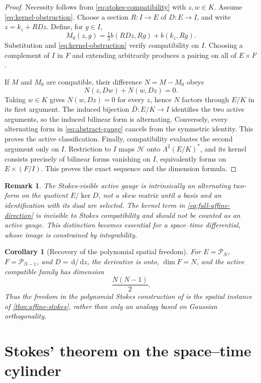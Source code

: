 \documentclass[11pt,a4paper]{article}
\newtheorem{corollary}[theorem]{Corollary}
\newtheorem{remark}[theorem]{Remark}
\newcommand{\cP}{\mathcal P}
\newcommand{\dd}{\,\mathrm d}
\begin{document}
\begin{proof}
Necessity follows from \cref{eq:stokes-compatibility} with \(z,w\in K\).
Assume \cref{eq:kernel-obstruction}. Choose a section
\(R:I\to E\) of \(D:E\to I\), and write \(z=k_z+RDz\). Define, for
\(g\in I\),
\[
 M_0(z,g)=\tfrac12 b(RDz,Rg)+b(k_z,Rg).
\]
Substitution and \cref{eq:kernel-obstruction} verify compatibility on
\(I\).  Choosing a complement of \(I\) in \(F\) and extending arbitrarily
produces a pairing on all of \(E\times F\).

If \(M\) and \(M_0\) are compatible, their difference \(N=M-M_0\) obeys
\[
 N(z,Dw)+N(w,Dz)=0.
\]
Taking \(w\in K\) gives \(N(w,Dz)=0\) for every \(z\), hence \(N\) factors
through \(E/K\) in its first argument.  The induced bijection
\(\bar D:E/K\to I\) identifies the two active arguments, so the induced
bilinear form is alternating. Conversely,
every alternating form in \cref{eq:abstract-gauge} cancels from the
symmetric identity.  This proves the active classification.  Finally,
compatibility evaluates the second argument only on \(I\).  Restriction to
\(I\) maps \(\mathcal H\) onto \(\Lambda^2(E/K)^*\), and its kernel
consists precisely of bilinear forms vanishing on \(I\), equivalently
forms on \(E\times(F/I)\).  This proves the exact sequence and the
dimension formula.
\end{proof}

\begin{remark}
The Stokes-visible active gauge is intrinsically an alternating two-form on
the quotient \(E/\ker D\), not a skew matrix until a basis and an
identification with its dual are selected.  The kernel term in
\cref{eq:full-affine-direction} is invisible to Stokes compatibility and
should not be counted as an active gauge.  This distinction becomes
essential for a space--time differential, whose image is constrained by
integrability.
\end{remark}

\begin{corollary}[Recovery of the polynomial spatial freedom]
\label{cor:2012-dimension}
For \(E=\cP_N\), \(F=\cP_{N-1}\), and
\(D=\dd/\dd z\), the derivative is onto, \(\dim F=N\), and the active
compatible family has dimension
\[
 \frac{N(N-1)}2.
\]
Thus the freedom in the polynomial Stokes construction of
\cite{moulla2012} is the spatial instance of
\cref{thm:affine-stokes}, rather than only an analogy based on Gaussian
orthogonality.
\end{corollary}

\section{Stokes' theorem on the space--time cylinder}
\end{document}
